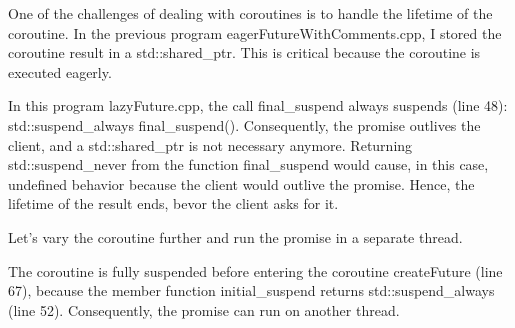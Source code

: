 \begin{tcolorbox}[colback=red!5!white,colframe=red!75!black,title={About the Numbers}]
One of the challenges of dealing with coroutines is to handle the lifetime of the coroutine. In the previous program eagerFutureWithComments.cpp, I stored the coroutine result in a std::shared\_ptr. This is critical because the coroutine is executed eagerly.

In this program lazyFuture.cpp, the call final\_suspend always suspends (line 48): std::suspend\_always final\_suspend(). Consequently, the promise outlives the client, and a std::shared\_ptr is not necessary anymore. Returning std::suspend\_never from the function final\_suspend would cause, in this case, undefined behavior because the client would outlive the promise. Hence, the lifetime of the result ends, bevor the client asks for it.
\end{tcolorbox}

Let’s vary the coroutine further and run the promise in a separate thread.


The coroutine is fully suspended before entering the coroutine createFuture (line 67), because the member function initial\_suspend returns std::suspend\_always (line 52). Consequently, the promise can run on another thread.

